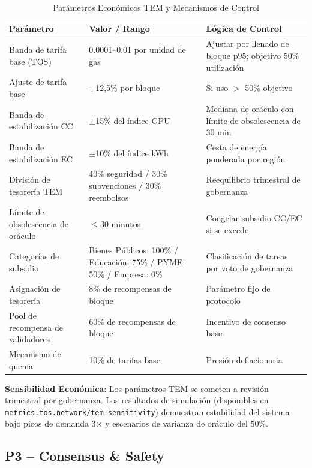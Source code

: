 \documentclass[11pt]{article}
\begin{document}
\begin{table}[H]
\centering
\caption{Parámetros Económicos TEM y Mecanismos de Control}
\label{tab:tem-parameters}
\begin{tabular}{@{}p{}p{}p{}@{}}
\toprule
\textbf{Parámetro} & \textbf{Valor / Rango} & \textbf{Lógica de Control} \\ \midrule
Banda de tarifa base (TOS) & 0.0001--0.01 por unidad de gas & Ajustar por llenado de bloque p95; objetivo 50\% utilización \\
Ajuste de tarifa base & +12,5\% por bloque & Si uso $>$ 50\% objetivo \\
Banda de estabilización CC & $\pm$15\% del índice GPU & Mediana de oráculo con límite de obsolescencia de 30 min \\
Banda de estabilización EC & $\pm$10\% del índice kWh & Cesta de energía ponderada por región \\
División de tesorería TEM & 40\% seguridad / 30\% subvenciones / 30\% reembolsos & Reequilibrio trimestral de gobernanza \\
Límite de obsolescencia de oráculo & $\le$30 minutos & Congelar subsidio CC/EC si se excede \\
Categorías de subsidio & Bienes Públicos: 100\% / Educación: 75\% / PYME: 50\% / Empresa: 0\% & Clasificación de tareas por voto de gobernanza \\
Asignación de tesorería & 8\% de recompensas de bloque & Parámetro fijo de protocolo \\
Pool de recompensa de validadores & 60\% de recompensas de bloque & Incentivo de consenso base \\
Mecanismo de quema & 10\% de tarifas base & Presión deflacionaria \\
\bottomrule
\end{tabular}
\end{table}

\textbf{Sensibilidad Económica}: Los parámetros TEM se someten a revisión trimestral por gobernanza. Los resultados de simulación (disponibles en \texttt{metrics.tos.network/tem-sensitivity}) demuestran estabilidad del sistema bajo picos de demanda 3$\times$ y escenarios de varianza de oráculo del 50\%.

\subsection{P3 -- Consensus \& Safety}
\label{sec:pillar-consensus}
\end{document}
